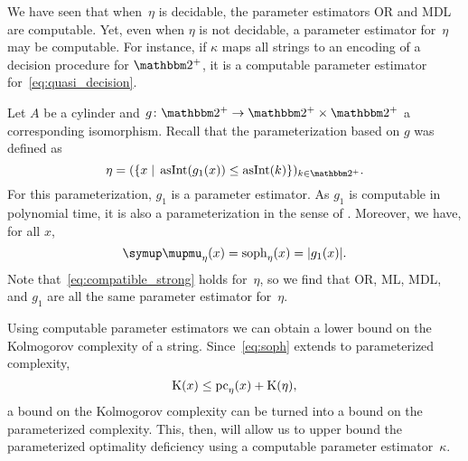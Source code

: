 We have seen that when~$\eta$ is decidable, the parameter estimators OR and MDL are computable.
Yet, even when $\eta$ is not decidable, a parameter estimator for~$\eta$ may be computable.
For instance, if $\kappa$ maps all strings to an encoding of a decision procedure for $\binary^+$, it is a computable parameter estimator for~\eqref{eq:quasi_decision}.

\begin{example}
  Let $A$ be a \pdash{}cylinder and $g\colon \binary^+ \to \binary^+ \times \binary^+$ a corresponding isomorphism.
  Recall that the parameterization based on $g$ was defined as
  \begin{equation*}
    \eta \deq (\{x \st \asNat(g_1(x)) \le \asNat(k)\})_{k \in \binary^+}.
  \end{equation*}
  For this parameterization, $g_1$ is a parameter estimator.
  As $g_1$ is computable in polynomial time, it is also a parameterization in the sense of \citeauthor{flum2006parameterized}.
  Moreover, we have, for all $x$,
  \begin{equation*}
    \mu_\eta(x) = \soph_\eta(x) = \length{g_1(x)}.
  \end{equation*}
  Note that~\eqref{eq:compatible_strong} holds for~$\eta$, so we find that OR, ML, MDL, and $g_1$ are all the same parameter estimator for~$\eta$.
\end{example}

Using computable parameter estimators we can obtain a lower bound on the Kolmogorov complexity of a string.
Since~\eqref{eq:soph} extends to parameterized complexity,
\begin{equation}
\label{eq:kclepc}
  \operatorname{K}(x) \le \operatorname{pc}_\eta(x) + \operatorname{K}(\eta),
\end{equation}
a bound on the Kolmogorov complexity can be turned into a bound on the parameterized complexity.
This, then, will allow us to upper bound the parameterized optimality deficiency using a computable parameter estimator~$\kappa$.

